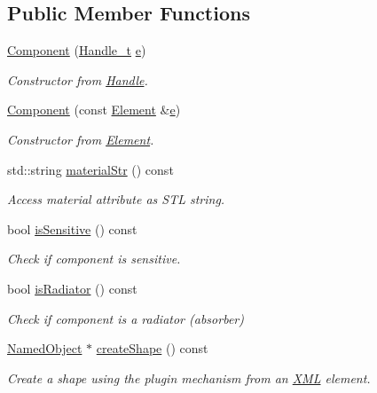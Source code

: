 \subsection*{Public Member Functions}
\begin{DoxyCompactItemize}
\item 
\hyperlink{struct_d_d4hep_1_1_x_m_l_1_1_component_aad3b73878abe65d69d7e53b4c2b043a0}{Component} (\hyperlink{class_d_d4hep_1_1_x_m_l_1_1_handle__t}{Handle\+\_\+t} \hyperlink{_volumes_8cpp_a8a9a1f93e9b09afccaec215310e64142}{e})
\begin{DoxyCompactList}\small\item\em Constructor from \hyperlink{class_d_d4hep_1_1_handle}{Handle}. \end{DoxyCompactList}\item 
\hyperlink{struct_d_d4hep_1_1_x_m_l_1_1_component_ab53e39ae951e177a0dc7e608611848a0}{Component} (const \hyperlink{class_d_d4hep_1_1_x_m_l_1_1_element}{Element} \&\hyperlink{_volumes_8cpp_a8a9a1f93e9b09afccaec215310e64142}{e})
\begin{DoxyCompactList}\small\item\em Constructor from \hyperlink{class_d_d4hep_1_1_x_m_l_1_1_element}{Element}. \end{DoxyCompactList}\item 
std\+::string \hyperlink{struct_d_d4hep_1_1_x_m_l_1_1_component_adf36187cb8fe18edc8e8d208c41fe69e}{material\+Str} () const
\begin{DoxyCompactList}\small\item\em Access material attribute as S\+TL string. \end{DoxyCompactList}\item 
bool \hyperlink{struct_d_d4hep_1_1_x_m_l_1_1_component_a075515092ea42a6ed41d3bb4a072de81}{is\+Sensitive} () const
\begin{DoxyCompactList}\small\item\em Check if component is sensitive. \end{DoxyCompactList}\item 
bool \hyperlink{struct_d_d4hep_1_1_x_m_l_1_1_component_a8a674bba3a085443e7d9be736e73d040}{is\+Radiator} () const
\begin{DoxyCompactList}\small\item\em Check if component is a radiator (absorber) \end{DoxyCompactList}\item 
\hyperlink{class_d_d4hep_1_1_named_object}{Named\+Object} $\ast$ \hyperlink{struct_d_d4hep_1_1_x_m_l_1_1_component_a3ca538523212995d2d8f81e99097e2ee}{create\+Shape} () const
\begin{DoxyCompactList}\small\item\em Create a shape using the plugin mechanism from an \hyperlink{namespace_d_d4hep_1_1_x_m_l}{X\+ML} element. \end{DoxyCompactList}\end{DoxyCompactItemize}

